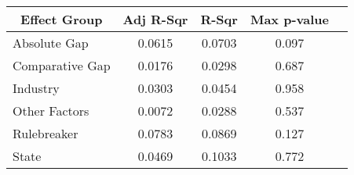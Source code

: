 {
\def\sym#1{\ifmmode^{#1}\else\(^{#1}\)\fi}
{
    \fontsize{8pt}{7pt}\selectfont
    \tabcolsep=3pt
    \begin{tabular}{l*{4}{c}}
        \toprule
        \multicolumn{1}{c}{Effect Group} & \multicolumn{1}{c}{Adj R-Sqr} & \multicolumn{1}{c}{R-Sqr} & \multicolumn{1}{c}{Max p-value} \\
        \midrule
        Absolute Gap                     & 0.0615                        & 0.0703                    & 0.097                           \\
        \addlinespace
        Comparative Gap                  & 0.0176                        & 0.0298                    & 0.687                           \\
        \addlinespace
        Industry                         & 0.0303                        & 0.0454                    & 0.958                           \\
        \addlinespace
        \addlinespace
        Other Factors                    & 0.0072                        & 0.0288                    & 0.537                           \\
        \addlinespace
        Rulebreaker                      & 0.0783                        & 0.0869                    & 0.127                           \\
        \addlinespace
        State                            & 0.0469                        & 0.1033                    & 0.772                           \\
        \bottomrule
    \end{tabular}
}
}

